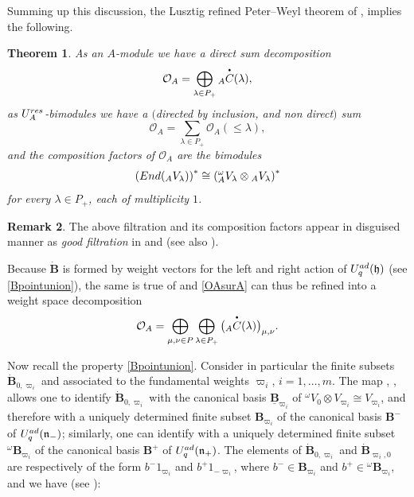 \documentclass[11pt]{article}
\numberwithin{equation}{section}
\numberwithin{equation}{section}
\newtheorem{teo}{Theorem}[section]
\theoremstyle{definition}
\newtheorem{Remark}[teo]{Remark}
\newcommand{\Oo}{{\mathcal O}}
\newcommand{\smallbullet}{%
\vcenter{\hbox{\,\scalebox{0.5}{$\bullet$}\,}}
}
\begin{document}
Summing up this discussion, the Lusztig refined Peter--Weyl theorem of \cite[Section~29.3]{Lusztig}, implies the following.

\begin{teo} As an $A$-module we have a direct sum decomposition
\begin{equation}\label{OAsurA} \Oo_A = \bigoplus_{\lambda\in P_+} {}_A \overset{\raisebox{-1.5pt}{\scriptsize$\smallbullet$}}{C} (\lambda),
\end{equation}
as $U_A^{\rm res}$-bimodules we have a $($directed by inclusion, and non direct$)$ sum
\begin{equation}\label{OAbimod}
\Oo_A = \sum_{\lambda\in P_+} \Oo_A(\leq \lambda),
\end{equation}
and the composition factors of $\Oo_A$ are the bimodules
\begin{equation}\label{OAfacteurs}
\left({\rm End}({}_A V_\lambda)\right)^* \cong \left({}_A^{\omega} V_\lambda \otimes {}_A V_\lambda \right)^*
\end{equation}
for every $\lambda\in P_+$, each of multiplicity $1$. \end{teo}
\begin{Remark}{\rm The above filtration and its composition factors appear in disguised manner as {\it good filtration} in \cite{APW} and \cite{Paradowski} (see also \cite{VV}).}
\end{Remark}
Because $\dot{\mathbf{B}}$ is formed by weight vectors for the left and right action of $U_q^{\rm ad}(\mathfrak{h})$ (see \eqref{Bpointunion}), the same is true of  and \eqref{OAsurA} can thus be refined into a weight space decomposition
\begin{equation}\label{OAweightdecomp} \Oo_A = \bigoplus_{\mu,\nu\in P}\bigoplus_{\lambda\in P_+} \big({}_A \overset{\raisebox{-1.5pt}{\scriptsize$\smallbullet$}}{C} (\lambda)\big)_{\mu,\nu}.
\end{equation}

Now recall the property \eqref{Bpointunion}. Consider in particular the finite subsets $\dot{\mathbf{B}}_{0,\varpi_i}$ and  associated to the fundamental weights $\varpi_i$, $i=1,\dots, m$. The map , , allows one to identify $\dot{\mathbf{B}}_{0,\varpi_i}$ with the canonical basis $\underline{\mathbf{B}}_{\varpi_i}$ of ${}^\omega V_{0}\otimes V_{\varpi_i} \cong V_{\varpi_i}$, and therefore with a uniquely determined finite subset $\mathbf{B}_{\varpi_i}$ of the canonical basis $\mathbf{B}^-$ of $U_q^{\rm ad}(\mathfrak{n}_-)$; similarly, one can identify  with a uniquely determined finite subset ${}^\omega \mathbf{B}_{\varpi_i}$ of the canonical basis $\mathbf{B}^+$ of $U_q^{\rm ad}(\mathfrak{n}_+)$. The elements of $\dot{\mathbf{B}}_{0,\varpi_i}$ and $\dot{\mathbf{B}}_{\varpi_i,0}$ are respectively of the form $b^-1_{\varpi_i}$ and $b^+1_{-\varpi_i}$, where $b^- \in \mathbf{B}_{\varpi_i}$ and $b^+\in {}^\omega \mathbf{B}_{\varpi_i}$, and we have (see \cite[Proposition~3.3 and Section~3.4]{Lusztig3}):
\end{document}
